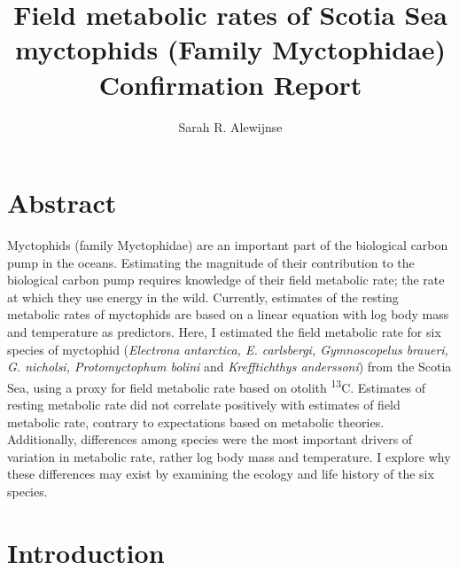 \documentclass[12pt, titlepage]{article}
\title{Field metabolic rates of Scotia Sea myctophids (Family Myctophidae)\\
\large{Confirmation Report}}
\author{Sarah R. Alewijnse}
\begin{document}
\maketitle
\tableofcontents
\pagebreak

\section{Abstract}

Myctophids (family Myctophidae) are an important part of the biological carbon pump in the oceans.
Estimating the magnitude of their contribution to the biological carbon pump requires knowledge of their field metabolic rate; the rate at which they use energy in the wild. %
Currently, estimates of the resting metabolic rates of myctophids are based on a linear equation with log body mass and temperature as predictors.
Here, I estimated the field metabolic rate for six species of myctophid (\textit{Electrona antarctica, E. carlsbergi, Gymnoscopelus braueri, G. nicholsi, Protomyctophum bolini} and \textit{Krefftichthys anderssoni}) from the Scotia Sea, using a proxy for field metabolic rate based on otolith \textdelta \textsuperscript{13}C.
Estimates of resting metabolic rate did not correlate positively with estimates of field metabolic rate, contrary to expectations based on metabolic theories.
Additionally, differences among species were the most important drivers of variation in metabolic rate, rather log body mass and temperature.
I explore why these differences may exist by examining the ecology and life history of the six species.

\pagebreak
\section{Introduction}
\end{document}
